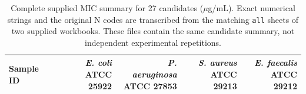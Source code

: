 \documentclass[journal]{IEEEtran}
\begin{document}
\begin{table}[!t]
\centering
\caption{Complete supplied MIC summary for 27 candidates ($\mu$g/mL). Exact numerical strings and the original N codes are transcribed from the matching \texttt{all} sheets of two supplied workbooks. These files contain the same candidate summary, not independent experimental repetitions.}
\label{tab:complete_mic_summary}
\begingroup
\renewcommand{\arraystretch}{1.05}
\begin{tabular*}{\textwidth}{@{\extracolsep{\fill}}lrrrr@{}}
\toprule
Sample ID & \shortstack{\textit{E. coli}\\ATCC 25922} & \shortstack{\textit{P. aeruginosa}\\ATCC 27853} & \shortstack{\textit{S. aureus}\\ATCC 29213} & \shortstack{\textit{E. faecalis}\\ATCC 29212} \\
\midrule


\end{tabular*}
\end{table}
\end{document}

